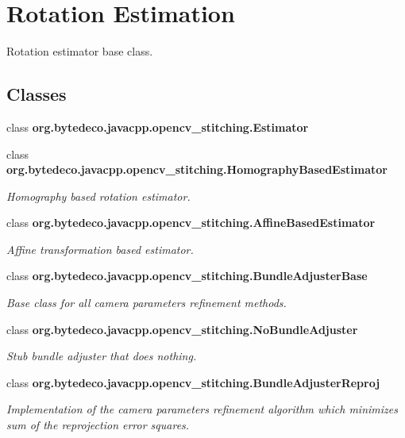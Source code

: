 \hypertarget{group__stitching__rotation}{}\section{Rotation Estimation}
\label{group__stitching__rotation}


Rotation estimator base class.  


\subsection*{Classes}
\begin{DoxyCompactItemize}
\item 
class {\bfseries org.\+bytedeco.\+javacpp.\+opencv\+\_\+stitching.\+Estimator}
\item 
class {\bfseries org.\+bytedeco.\+javacpp.\+opencv\+\_\+stitching.\+Homography\+Based\+Estimator}
\begin{DoxyCompactList}\small\item\em Homography based rotation estimator. \end{DoxyCompactList}\item 
class {\bfseries org.\+bytedeco.\+javacpp.\+opencv\+\_\+stitching.\+Affine\+Based\+Estimator}
\begin{DoxyCompactList}\small\item\em Affine transformation based estimator. \end{DoxyCompactList}\item 
class {\bfseries org.\+bytedeco.\+javacpp.\+opencv\+\_\+stitching.\+Bundle\+Adjuster\+Base}
\begin{DoxyCompactList}\small\item\em Base class for all camera parameters refinement methods. \end{DoxyCompactList}\item 
class {\bfseries org.\+bytedeco.\+javacpp.\+opencv\+\_\+stitching.\+No\+Bundle\+Adjuster}
\begin{DoxyCompactList}\small\item\em Stub bundle adjuster that does nothing. \end{DoxyCompactList}\item 
class {\bfseries org.\+bytedeco.\+javacpp.\+opencv\+\_\+stitching.\+Bundle\+Adjuster\+Reproj}
\begin{DoxyCompactList}\small\item\em Implementation of the camera parameters refinement algorithm which minimizes sum of the reprojection error squares. \end{DoxyCompactList}\item 

\end{DoxyCompactItemize}
